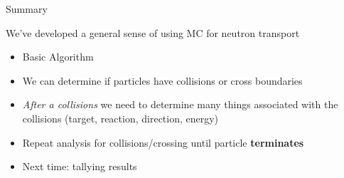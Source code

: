 \documentclass[xcolor=x11names,compress]{beamer}
\renewcommand{\(}{\begin{columns}}
\renewcommand{\)}{\end{columns}}
\newcommand{\<}[1]{\begin{column}{#1}}
\renewcommand{\>}{\end{column}}
\begin{document}
\begin{frame}{Summary}

We've developed a general sense of using MC for neutron transport
\begin{itemize}
    \item Basic Algorithm
    \pause
    \vspace*{0.5 em}
    \item We can determine if particles have collisions or cross boundaries
    \item \textit{After a collisions} we need to determine many things associated with the collisions (target, reaction, direction, energy)
    \item Repeat analysis for collisions/crossing until particle \textbf{terminates}
    \pause
    \vspace*{0.5 em}
    \item Next time: tallying results
\end{itemize}


\end{frame}
\end{document}
